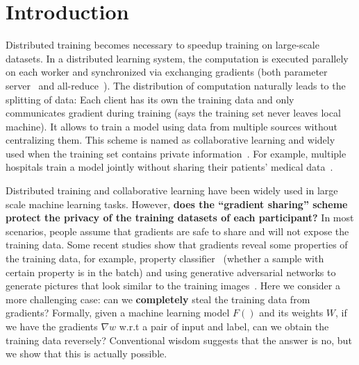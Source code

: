 \section{Introduction}
Distributed training becomes necessary to speedup training on large-scale datasets.
In a distributed learning system, the computation is executed parallely on each worker and synchronized via exchanging gradients (both parameter server~\cite{li2014scaling, iandola2016firecaffe} and all-reduce~\cite{barney2010introduction_to_parallel_computing, patarasuk2009ring_all_reduce}).
The distribution of computation naturally leads to the splitting of data: 
Each client has its own the training data and only communicates gradient during training (says the training set never leaves local machine). 
It allows to train a model using data from multiple sources without centralizing them. This scheme is named as collaborative learning and widely used when the training set contains private information~\cite{jochems2016distributed, google2016federated}. For example, multiple hospitals train a model jointly without sharing their patients' medical data~\cite{jochems2017developing, mcmahan2016communication}. 

Distributed training and collaborative learning have been widely used in large scale machine learning tasks. However, \textbf{does the ``gradient sharing'' scheme protect the privacy of the training datasets of each participant?} 
In most scenarios, people assume that gradients are safe to share and will not expose the training data. Some recent studies show that gradients reveal some properties of the training data, for example, property classifier~\cite{Melis2018unintended} (whether a sample with certain property is in the batch) and using generative adversarial networks to generate pictures that look similar to the training images~\cite{hitaj2017information, Melis2018unintended, fredrikson2015model_inversion}. 
Here we consider a more challenging case: can we \textbf{completely} steal the training data from gradients? 
Formally, given a machine learning model $F()$ and its weights $W$, if we have the gradients $\nabla w$ w.r.t a pair of input and label, can we obtain the training data reversely? 
Conventional wisdom suggests that the answer is no, but we show that this is actually possible. 


